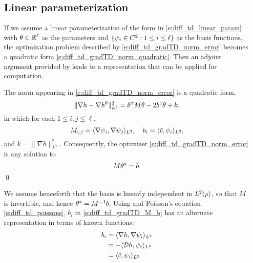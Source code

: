 \subsection{Linear parameterization}
If we assume a linear parameterization of the form in \eqref{e:diff_td_linear_param} with $\theta \in \mathbb{R}^\ell$ as the parameters and $\{\psi_i \in C^2: 1\leq i \leq \ell \}$ as the basis functions, the optimization problem described by \eqref{e:diff_td_gradTD_norm_error} becomes a quadratic form \eqref{e:diff_td_gradTD_norm_quadratic}. Then an adjoint argument provided by  leads to a representation that can be applied for computation.  
\begin{lemma}
	\label{lemma:gradTD}
	The norm appearing in \eqref{e:diff_td_gradTD_norm_error} is a quadratic form,
	\begin{equation}
	\|\nabla h - \nabla h^\param\|^2_{L^2} = \param^\transpose M \param - 2b^\transpose\param + k ,
	\label{e:diff_td_gradTD_norm_quadratic}
	\end{equation}
	in which for each $1\le i, j\le \ell$,
	\begin{equation}
	M_{i,j} = \langle \gradbasis_i, \gradbasis_j \rangle_{L^2}, \quad b_i = \langle \tilc, \basis_i \rangle_{L^2},
	\label{e:diff_td_gradTD_M_b}
	\end{equation}
	and $k = \| \nabla h \|^2_{L^2}$.  Consequently, the optimizer \eqref{e:diff_td_gradTD_norm_error}
	is any solution to
	\begin{equation}
	M \param^* = b.
	\label{e:diff_td_gradTD_theta}
	\end{equation}
	\qed
\end{lemma}

We assume henceforth  that the basis is linearly independent in $L^2(\rho)$, so that $M$ is invertible, and hence $\theta^* = M^{-1}b$. Using  and Poisson's equation \eqref{e:diff_td_poissons}, $b_i$ in \eqref{e:diff_td_gradTD_M_b} has an alternate representation in terms of known functions:
\begin{equation}
\begin{aligned}
b_i & = \langle \nabla h, \nabla \basis_i \rangle_{L^2} \\ 
& = - \langle \generate h, \basis_i \rangle_{L^2} \\ 
& =\langle \tilc, \basis_i \rangle_{L^2}.
\label{e:diff_td_gradTD_b_alt}
\end{aligned}
\end{equation}

